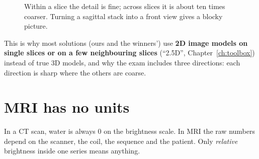 \begin{figure}[H]
\centering
{}
\caption{Within a slice the detail is fine; across slices it is about ten times coarser. Turning a sagittal stack
into a front view gives a blocky picture.}
\end{figure}

\begin{why}
This is why most solutions (ours and the winners') use \textbf{2D image models on single slices or on a few
neighbouring slices} (``2.5D'', Chapter~\ref{ch:toolbox}) instead of true 3D models, and why the exam includes
three directions: each direction is sharp where the others are coarse.
\end{why}

\section{MRI has no units}

In a CT scan, water is always 0 on the brightness scale. In MRI the raw numbers depend on the scanner, the coil,
the sequence and the patient. Only \emph{relative} brightness inside one series means anything.


